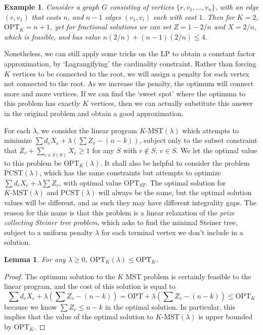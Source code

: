 \documentclass{article}
\theoremstyle{plain}
\newtheorem{lemma}{Lemma}
\newtheorem*{example}{Example}
\theoremstyle{plain}
\begin{document}
\begin{example}
    Consider a graph $G$ consisting of vertices $\{ r, v_1, \dots, v_n \}$, with an edge $(r,v_1)$ that costs $n$, and $n-1$ edges $(v_1,v_i)$ each with cost $1$. Then for $K = 2$, $\text{OPT}_K = n+1$, yet for fractional solutions we can set $Z = 1 - 2/n$ and $X = 2/n$, which is feasible, and has value $n(2/n) + (n-1)(2/n) \leq 4$.
\end{example}

Nonetheless, we can still apply some tricks on the LP to obtain a constant factor approximation, by `Lagrangifying' the cardinality constraint. Rather than forcing $K$ vertices to be connected to the root, we will assign a penalty for each vertex not connected to the root. As we increase the penalty, the optimum will connect more and more vertices. If we can find the `sweet spot' where the optimum to this problem has exactly $K$ vertices, then we can actually substitute this answer in the original problem and obtain a good approximation.

For each $\lambda$, we consider the linear program $K\text{-MST}(\lambda)$ which attempts to minimize $\sum d_eX_e + \lambda (\sum Z_v - (n-k))$, subject only to the subset constraint that $Z_v + \sum_{e \in \delta(S)} X_e \geq 1$ for any $S$ with $r \not \in S$, $v \in S$. We let the optimal value to this problem be $\text{OPT}_K(\lambda)$. It shall also be helpful to consider the problem $\text{PCST}(\lambda)$, which has the same constraints but attempts to optimize $\sum d_eX_e + \lambda \sum Z_v$, with optimal value $\text{OPT}_{ST}$. The optimal solution for $K\text{-MST}(\lambda)$ and $\text{PCST}(\lambda)$ will always be the same, but the optimal solution values will be different, and as such they may have different integrality gaps. The reason for this name is that this problem is a linear relaxation of the {\it prize collecting Steiner tree problem}, which asks to find the minimal Steiner tree, subject to a uniform penalty $\lambda$ for each terminal vertex we don't include in a solution.

\begin{lemma}
    For any $\lambda \geq 0$, $\text{OPT}_K(\lambda) \leq \text{OPT}_K$.
\end{lemma}
\begin{proof}
    The optimum solution to the $K$ MST problem is certainly feasible to the linear program, and the cost of this solution is equal to
    \[ \sum d_e X_e + \lambda(\sum Z_v - (n-k)) = \text{OPT} + \lambda(\sum Z_v - (n-k)) \leq \text{OPT}_K \]
    because we know $\sum Z_v \leq n-k$ in the optimal solution. In particular, this implies that the value of the optimal solution to $K\text{-MST}(\lambda)$ is upper bounded by $\text{OPT}_K$.
\end{proof}
\end{document}
